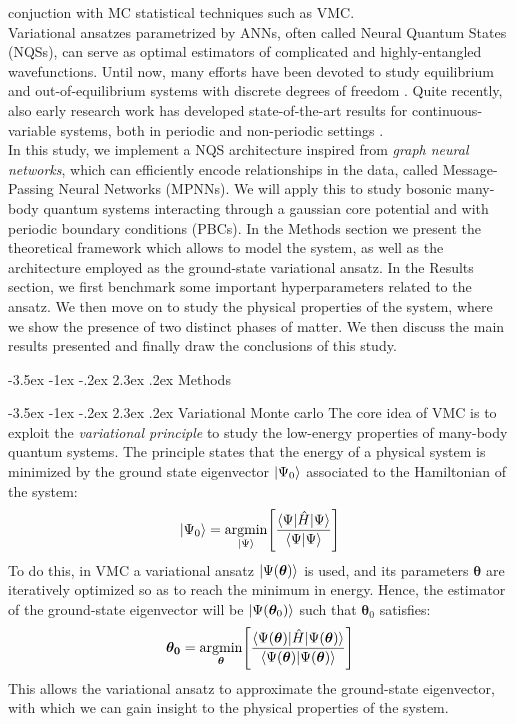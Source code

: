 \documentclass[a4paper, 12pt, oneside]{article}
\makeatletter
\DeclareMathOperator*{\argmin}{argmin}
\renewcommand{\section}{\@startsection{section}{1}{\z@}%
             {-3.5ex \@plus-1ex \@minus-.2ex}%
             {2.3ex \@plus.2ex}%
             {\normalfont\large\bfseries}}
\renewcommand{\subsection}{\@startsection{subsection}{1}{\z@}%
             {-3.5ex \@plus-1ex \@minus-.2ex}%
             {2.3ex \@plus.2ex}%
             {\normalfont\normalsize\bfseries}}
\makeatother
\begin{document}
conjuction with MC statistical techniques such as VMC.\\
Variational ansatzes parametrized by ANNs, often called Neural Quantum States (NQSs), can serve as optimal estimators of 
complicated and highly-entangled wavefunctions. Until now, many efforts have been devoted to study equilibrium 
and out-of-equilibrium systems with discrete degrees of freedom \cite{carleo_2017, hibat-allah_2020, choo_2018, 
choo_2020, czischek_2018, yoshioka_2021}. 
Quite recently, also early research work has developed state-of-the-art results for continuous-variable 
systems, both in periodic and non-periodic settings \cite{pescia_2022, pescia_2023, pfau_2020, hermann_2020}. \\
In this study, we implement a NQS architecture inspired from \textit{graph neural networks}, which can efficiently 
encode relationships in the data, called Message-Passing Neural Networks (MPNNs). We will apply this 
to study bosonic many-body quantum systems interacting through a gaussian core potential and with 
periodic boundary conditions (PBCs). In the Methods 
section we present the theoretical framework which allows to model the system, 
as well as the architecture employed as the ground-state variational ansatz. In the Results section, 
we first benchmark some important hyperparameters related to the ansatz. We then move on to study the 
physical properties of the system, where we show the presence of two distinct phases of matter. We 
then discuss the main results presented and finally draw the conclusions of this study.

\section{Methods}\label{sec:methods}

\subsection{Variational Monte carlo}\label{sec:var_principle}
The core idea of VMC is to exploit the {\it variational principle} to study the low-energy 
properties of many-body quantum systems. The principle states that the energy of a physical system is minimized 
by the ground state eigenvector $\ket{\Psi_0}$ associated to the Hamiltonian of the system:
\begin{equation}
    \ket{\Psi_0} = \argmin_{\ket{\Psi}} \Biggr[\dfrac{\braket{\Psi|\hat{H}|\Psi}}{\braket{\Psi|\Psi}}\Biggr]
\end{equation}
To do this, in VMC a variational ansatz $\ket{\Psi(\bm{\theta})}$ is used, and its parameters $\bm{\theta}$ are 
iteratively optimized so as to reach 
the minimum in energy. Hence, the estimator of the ground-state eigenvector will be $\ket{\Psi(\bm{\theta}_0)}$ such that $\bm{\theta}_0$ 
satisfies:
\begin{equation}
    \bm{\theta_0} = \argmin_{\bm{\theta}}\Biggr[\dfrac{\braket{\Psi(\bm{\theta})|\hat{H}|\Psi(\bm{\theta})}}
    {\braket{\Psi(\bm{\theta})|\Psi(\bm{\theta})}}\Biggr]
\end{equation}
This allows the variational ansatz to approximate the ground-state
eigenvector, with which we can gain insight to the physical properties of the 
system. 
\end{document}
